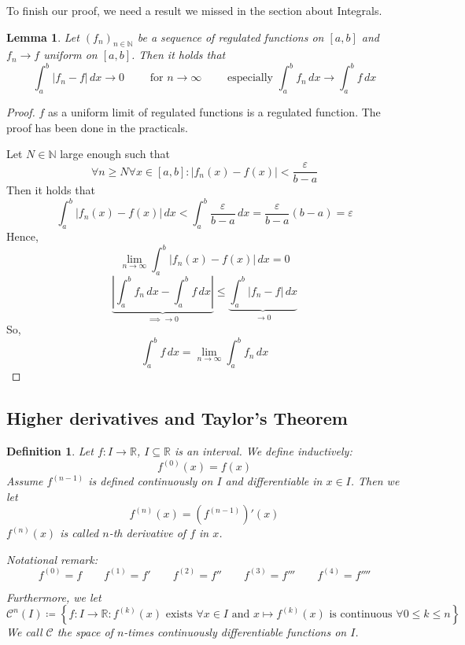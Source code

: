 \documentclass{article}
\newtheorem{definition}{Definition}  \numberwithin{definition}{section}
\newtheorem{lemma}{Lemma}  \numberwithin{lemma}{section}
\newcommand{\set}[1]{\left\{#1\right\}}
\newcommand{\card}[1]{\left|#1\right|}
\begin{document}
To finish our proof, we need a result we missed in the section about Integrals.

\begin{lemma}
  Let $(f_n)_{n \in \mathbb N}$ be a sequence of regulated functions on $[a,b]$ and
  $f_n \to f$ uniform on $[a,b]$. Then it holds that
  \[ \int_a^b \card{f_n - f} \, dx \to 0 \qquad \text{ for } n \to \infty \qquad \text{ especially } \int_a^b f_n \, dx \to \int_a^b f \, dx \]
\end{lemma}

\begin{proof}
  $f$ as a uniform limit of regulated functions is a regulated function.
  The proof has been done in the practicals.

  Let $N \in \mathbb N$ large enough such that
  \[ \forall n \geq N \forall x \in [a,b]: \card{f_n(x) - f(x)} < \frac{\varepsilon}{b - a} \]
  Then it holds that
  \[ \int_a^b \card{f_n(x) - f(x)} \, dx < \int_a^b \frac{\varepsilon}{b - a} \, dx = \frac{\varepsilon}{b - a} (b - a) = \varepsilon \]
  Hence,
  \[ \lim_{n\to\infty} \int_a^b \card{f_n(x) - f(x)} \, dx = 0 \]
  \[ \underbrace{\card{\int_a^b f_n \, dx - \int_a^b f \, dx}}_{\implies \to 0 } \leq \underbrace{\int_a^b \card{f_n - f} \, dx}_{\to 0} \]
  So,
  \[ \int_a^b f \, dx = \lim_{n\to\infty} \int_a^b f_n \, dx \]
\end{proof}

\subsection{Higher derivatives and Taylor's Theorem}

\begin{definition} %
  Let $f: I \to \mathbb R$, $I \subseteq \mathbb R$ is an interval.
  We define inductively:
  \[ f^{(0)}(x) = f(x) \]
  Assume $f^{(n-1)}$ is defined continuously on $I$ and differentiable in $x \in I$.
  Then we let
  \[ f^{(n)}(x) = \left(f^{(n-1)}\right)'(x) \]
  $f^{(n)}(x)$ is called $n$-th derivative of $f$ in $x$.
  
  Notational remark:
  \[ f^{(0)} = f \qquad f^{(1)} = f' \qquad f^{(2)} = f'' \qquad f^{(3)} = f''' \qquad f^{(4)} = f'''' \]

  Furthermore, we let
  \[ \mathcal C^n(I) \coloneqq \set{f: I \to \mathbb R: f^{(k)}(x) \text{ exists } \forall x \in I \text{ and } x \mapsto f^{(k)}(x) \text{ is continuous } \forall 0 \leq k \leq n} \]
  We call $\mathcal C$ the space of $n$-times continuously differentiable functions on $I$.
\end{definition}
\end{document}
